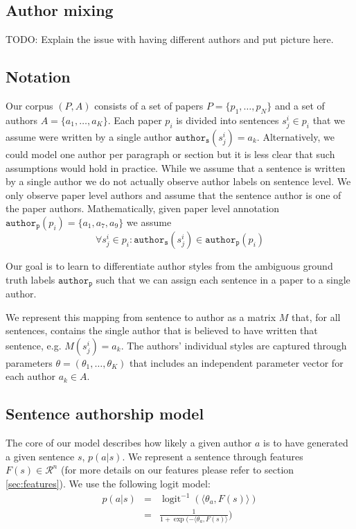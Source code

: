 
\subsection{Author mixing}\label{subsec:author_mixing}

TODO: Explain the issue with having different authors and put picture here.

\subsection{Notation}

Our corpus $(P,A)$ consists of a set of papers $P=\{p_1, \dots, p_N\}$ and a set of authors $A=\{a_1, \dots, a_K\}$.
Each paper $p_i$ is divided into sentences $s_j^i \in p_i$ that we assume were written by a single author $\mathtt{author_s}(s_j^i)=a_k$.
Alternatively, we could model one author per paragraph or section but it is less clear that such assumptions would hold in practice.
While we assume that a sentence is written by a single author we do not actually observe author labels on sentence level.
We only observe paper level authors and assume that the sentence author is one of the paper authors.
Mathematically, given paper level annotation $\mathtt{author_p}(p_i)=\{a_1, a_7, a_9\}$ we assume 
$$\forall s_j^i\in p_i: \mathtt{author_s}(s_j^i) \in \mathtt{author_p}(p_i)$$

Our goal is to learn to differentiate author styles from the ambiguous ground truth labels $\mathtt{author_p}$ such that we can assign each sentence in a paper to a single author.

We represent this mapping from sentence to author as a matrix $M$ that, for all sentences, contains the single author that is believed to have written that sentence, e.g. $M(s_j^i)=a_k$.
The authors' individual styles are captured through parameters $\theta=(\theta_1, \dots, \theta_K)$ that includes an independent parameter vector for each author $a_k \in A$.

\subsection{Sentence authorship model}
The core of our model describes how likely a given author $a$ is to have generated a given sentence $s$, $p(a|s)$.
We represent a sentence through features $F(s) \in \mathcal{R}^n$ (for more details on our features please refer to section \ref{sec:features}).
We use the following logit model:
\begin{align*}
p(a|s) &=& \operatorname{logit}^{-1}(\langle\theta_a, F(s)\rangle) \\
&=& \frac{1}{1+ \exp({-\langle\theta_a, F(s)\rangle}})
\end{align*}


